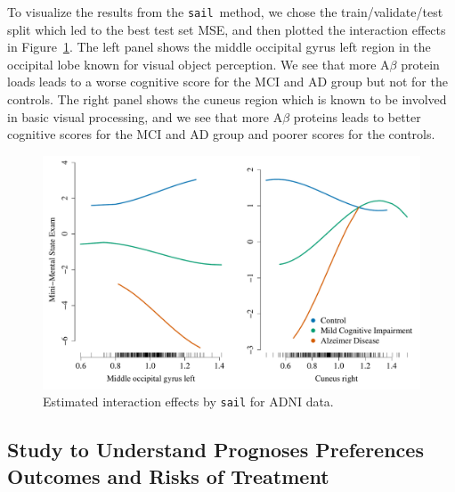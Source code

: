 \documentclass[12pt,letter]{article}\usepackage[]{graphicx}\usepackage[]{color}
\newenvironment{knitrout}{}{} %
\newcommand{\sail}{\texttt{sail}}
\begin{document}
To visualize the results from the \sail ~method, we chose the train/validate/test split which led to the best test set MSE, and then plotted the interaction effects in Figure~\ref{fig:plot-inter-adni}. The left panel shows the middle occipital gyrus left region in the occipital lobe known for visual object perception. We see that more A$\beta$ protein loads leads to a worse cognitive score for the MCI and AD group but not for the controls. The right panel shows the cuneus region which is known to be involved in basic visual processing, and we see that more A$\beta$ proteins leads to better cognitive scores for the MCI and AD group and poorer scores for the controls.



\begin{knitrout}\scriptsize
{}\color{fgcolor}\begin{figure}[H]

{\centering \includegraphics[width=1\linewidth]{figure/plot-inter-adni-1} 

}

\caption[Estimated interaction effects by \texttt{sail} for ADNI data]{Estimated interaction effects by \texttt{sail} for ADNI data.}\label{fig:plot-inter-adni}
\end{figure}


\end{knitrout}


\subsection{Study to Understand Prognoses Preferences Outcomes and Risks of Treatment}
\end{document}

